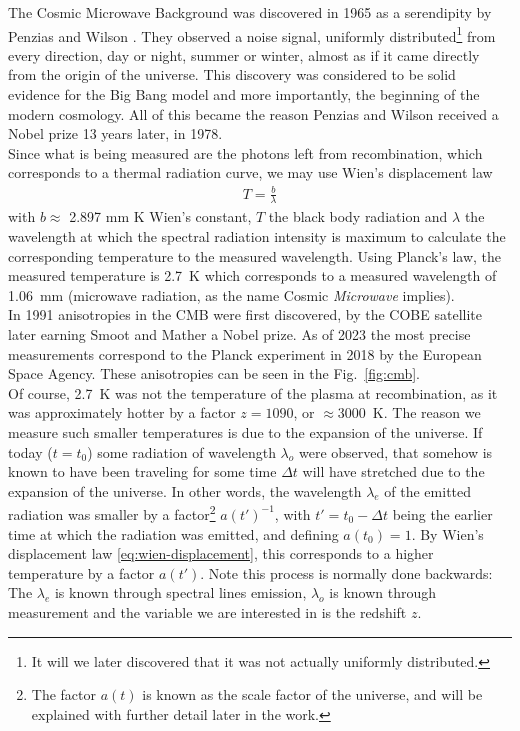 The Cosmic Microwave Background was discovered in 1965 as a serendipity by Penzias and Wilson \cite{Penzias1965}. They observed a noise signal, uniformly distributed\footnote{It will we later discovered that it was not actually uniformly distributed.} from every direction, day or night, summer or winter, almost as if it came directly from the origin of the universe.
This discovery was considered to be solid evidence for the Big Bang model and more importantly, the beginning of the modern cosmology. All of this became the reason Penzias and Wilson received a Nobel prize 13 years later, in 1978. \\

Since what is being measured are the photons left from recombination, which corresponds to a thermal radiation curve, we may use Wien's displacement law  \\
\begin{align}
	T = \frac{b}{\lambda}
	\label{eq:wien-displacement}
\end{align}
with $b\approx $ 2.897 mm K Wien's constant, $T$ the black body radiation and $\lambda$ the wavelength at which the spectral radiation intensity is maximum to calculate the corresponding temperature to the measured wavelength. Using Planck's law, the measured temperature is \SI{2.7}{K} which corresponds to a measured wavelength of \SI{1.06}{mm} (microwave radiation, as the name Cosmic \textit{Microwave} implies). \\

In 1991 anisotropies in the CMB were first discovered, by the COBE satellite\cite{SmootMather} later earning Smoot and Mather a Nobel prize. As of 2023 the most precise measurements correspond to the Planck experiment in 2018 \cite{Planck2018} by the European Space Agency. These anisotropies can be seen in the Fig.~\ref{fig:cmb}. \\

Of course, \SI{2.7}{K} was not the temperature of the plasma at recombination, as it was approximately hotter by a factor $z=1090$, or $\approx$\SI{3000}{K}. The reason we measure such smaller temperatures is due to the expansion of the universe.
If today ($t=t_0$) some radiation of wavelength $\lambda_o$ were observed, that somehow is known to have been traveling for some time $\Delta t$ will have stretched due to the expansion of the universe. In other words, the wavelength $\lambda_e$ of the emitted radiation was smaller by a factor\footnote{The factor $a(t)$ is known as the scale factor of the universe, and will be explained with further detail later in the work.} $a(t')^{-1}$, with $t' = t_0-\Delta t$ being the earlier time at which the radiation was emitted, and defining $a(t_0)=1$. By Wien's displacement law \eqref{eq:wien-displacement}, this corresponds to a higher temperature by a factor $a(t')$. Note this process is normally done backwards: The $\lambda_e$ is known through spectral lines emission, $\lambda_o$ is known through measurement and the variable we are interested in is the redshift $z.$\\


